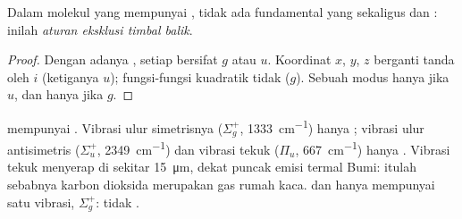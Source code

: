 \begin{proposition}\label{prop:b3:group-theory-applied:mutual-exclusion}
Dalam molekul yang mempunyai , tidak ada fundamental yang
sekaligus  dan : inilah \emph{aturan eksklusi timbal
balik}.
\end{proposition}

\begin{proof}
Dengan adanya , setiap  bersifat $g$
atau $u$. Koordinat $x$, $y$, $z$ berganti tanda oleh $i$ (ketiganya $u$);
fungsi-fungsi kuadratik tidak ($g$). Sebuah modus hanya  jika $u$, dan
hanya  jika $g$.
\end{proof}

\begin{example}\label{ex:b3:group-theory-applied:co2}
 mempunyai . Vibrasi ulur simetrisnya ($\Sigma_g^+$,
\qty{1333}{cm^{-1}}) hanya ; vibrasi ulur antisimetris ($\Sigma_u^+$,
\qty{2349}{cm^{-1}}) dan vibrasi tekuk ($\Pi_u$, \qty{667}{cm^{-1}}) hanya . Vibrasi tekuk menyerap di sekitar \qty{15}{\micro m}, dekat puncak emisi
termal Bumi: itulah sebabnya karbon dioksida merupakan gas rumah kaca.
 dan  hanya mempunyai satu vibrasi, $\Sigma_g^+$: tidak .
\end{example}

